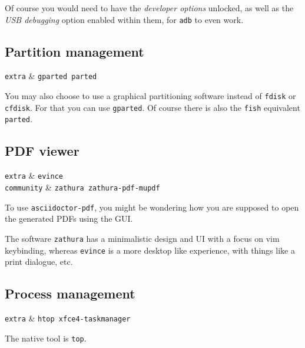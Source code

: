 \documentclass[10pt]{dustdoc}
\begin{document}
\begin{NOTE}
    Of course you would need to have the \emph{developer options} unlocked, as well as the \emph{USB debugging} option enabled within them, for \texttt{adb} to even work.
\end{NOTE}

\subsection{Partition management}%
\label{sec:partition-management}

\begin{pkgtable}
    \texttt{extra} & \texttt{gparted parted} \\
\end{pkgtable}

You may also choose to use a graphical partitioning software instead of \texttt{fdisk} or \texttt{cfdisk}.
For that you can use \texttt{gparted}.
Of course there is also the \texttt{fish} equivalent \texttt{parted}.

\subsection{PDF viewer}%
\label{sec:gui-pdf-viewer}

\begin{pkgtable}
    \texttt{extra} & \texttt{evince} \\
    \texttt{community} & \texttt{zathura zathura-pdf-mupdf} \\
\end{pkgtable}

To use \texttt{asciidoctor-pdf}, you might be wondering how you are supposed to open the generated PDFs using the GUI.\@

The software \texttt{zathura} has a minimalistic design and UI with a focus on vim keybinding, whereas \texttt{evince} is a more desktop like experience, with things like a print dialogue, etc.

\subsection{Process management}%
\label{sec:process-management}

\begin{pkgtable}
    \texttt{extra} & \texttt{htop xfce4-taskmanager} \\
\end{pkgtable}

The native tool is \texttt{top}.
\end{document}
